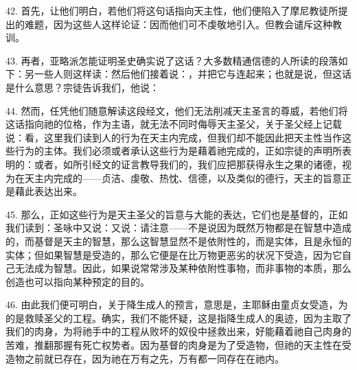 42. 首先，让他们明白，若他们将这句话指向天主性，他们便陷入了摩尼教徒所提出的难题，因为这些人这样论证：因而他们可不虔敬地引入。但教会谴斥这种教训。\par

43. 再者，亚略派怎能证明圣史确实说了这话？大多数精通信德的人所读的段落如下：另一些人则这样读：然后他们接着说：，并把它与连起来；也就是说，但这话是什么意思？宗徒告诉我们，他说：\par

44. 然而，任凭他们随意解读这段经文，他们无法削减天主圣言的尊威，若他们将这话指向祂的位格，作为主语，就无法不同时侮辱天主圣父，关于圣父经上记载说：看，这里我们读到人的行为在天主内完成，但我们却不能因此把天主性当作这些行为的主体。我们必须或者承认这些行为是藉着祂完成的，正如宗徒的声明所表明的：或者，如所引经文的证言教导我们的，我们应把那获得永生之果的诸德，视为在天主内完成的——贞洁、虔敬、热忱、信德，以及类似的德行，天主的旨意正是藉此表达出来。\par

45. 那么，正如这些行为是天主圣父的旨意与大能的表达，它们也是基督的，正如我们读到：圣咏中又说：又说：请注意——不是说因为既然万物都是在智慧中造成的，而基督是天主的智慧，那么这智慧显然不是依附性的，而是实体，且是永恒的实体；但如果智慧是受造的，那么它便是在比万物更恶劣的状况下受造，因为它自己无法成为智慧。因此，如果说常常涉及某种依附性事物，而非事物的本质，那么创造也可以指向某种预定的目的。\par

\par

46. 由此我们便可明白，关于降生成人的预言，意思是，主耶稣由童贞女受造，为的是救赎圣父的工程。确实，我们不能怀疑，这是指降生成人的奥迹，因为主取了我们的肉身，为将祂手中的工程从败坏的奴役中拯救出来，好能藉着祂自己肉身的苦难，推翻那握有死亡权势者。因为基督的肉身是为了受造物，但祂的天主性在受造物之前就已存在，因为祂在万有之先，万有都一同存在在祂内。\par

